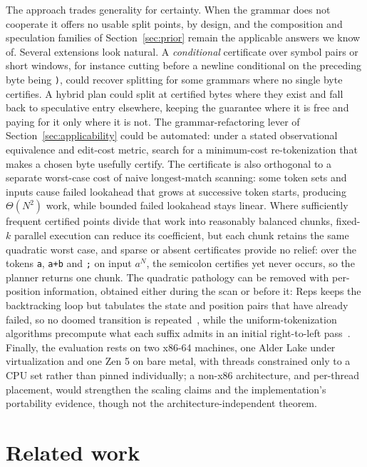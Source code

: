 \documentclass[11pt,a4paper]{article}
\theoremstyle{definition}
\theoremstyle{plain}
\newcommand{\code}[1]{\texttt{#1}}
\begin{document}
The approach trades generality for certainty. When the grammar does not cooperate it offers no usable split points, by
design, and the composition and speculation families of Section~\ref{sec:prior} remain the applicable answers we know
of. Several extensions look natural. A \emph{conditional} certificate over symbol pairs or short windows, for instance
cutting before a newline conditional on the preceding byte being \code{)}, could recover splitting for some grammars
where no single byte certifies. A hybrid plan could split at certified bytes where they exist and fall back to
speculative entry elsewhere, keeping the guarantee where it is free and paying for it only where it is not. The
grammar-refactoring lever of Section~\ref{sec:applicability} could be automated: under a stated observational
equivalence and edit-cost metric, search for a minimum-cost re-tokenization that makes a chosen byte usefully certify.
The certificate is also orthogonal to a separate worst-case cost of naive longest-match scanning: some token sets and
inputs cause failed lookahead that grows at successive token starts, producing $\Theta(N^2)$ work, while bounded
failed lookahead stays linear. Where sufficiently frequent certified points divide that work into reasonably balanced
chunks, fixed-$k$ parallel execution can reduce its coefficient, but each chunk retains the same quadratic worst case,
and sparse or absent certificates provide no relief: over the tokens \code{a}, \code{a+b} and \code{;} on input $a^N$,
the semicolon certifies yet never occurs, so the planner returns one chunk. The quadratic pathology can be removed
with per-position information, obtained either during the scan or before it: Reps keeps the backtracking loop but
tabulates the state and position pairs that have already failed, so no doomed transition is
repeated~\cite{reps1998maximal}, while the uniform-tokenization algorithms precompute what each suffix admits in an
initial right-to-left pass~\cite{li2025uniform}. Finally, the evaluation rests on two x86-64 machines, one Alder Lake
under virtualization and one Zen 5 on bare metal, with threads constrained only to a CPU set rather than pinned
individually; a non-x86 architecture, and per-thread placement, would strengthen the scaling claims and the
implementation's portability evidence, though not the architecture-independent theorem.

\section{Related work}
\label{sec:related}
\end{document}
